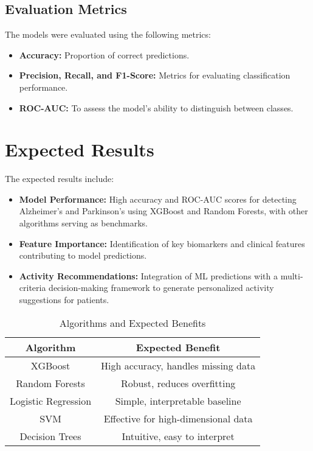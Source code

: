\documentclass[conference]{IEEEtran}
\begin{document}
\subsection{Evaluation Metrics}
The models were evaluated using the following metrics:
\begin{itemize}
    \item \textbf{Accuracy:} Proportion of correct predictions.
    \item \textbf{Precision, Recall, and F1-Score:} Metrics for evaluating classification performance.
    \item \textbf{ROC-AUC:} To assess the model's ability to distinguish between classes.
\end{itemize}

\section{Expected Results}
The expected results include:
\begin{itemize}
    \item \textbf{Model Performance:} High accuracy and ROC-AUC scores for detecting Alzheimer’s and Parkinson’s using XGBoost and Random Forests, with other algorithms serving as benchmarks.
    \item \textbf{Feature Importance:} Identification of key biomarkers and clinical features contributing to model predictions.
    \item \textbf{Activity Recommendations:} Integration of ML predictions with a multi-criteria decision-making framework to generate personalized activity suggestions for patients.
\end{itemize}

\begin{table}[htbp]
\caption{Algorithms and Expected Benefits}
\begin{center}
\begin{tabular}{|c|c|}
\hline
\textbf{Algorithm} & \textbf{Expected Benefit} \\
\hline
XGBoost & High accuracy, handles missing data \\
\hline
Random Forests & Robust, reduces overfitting \\
\hline
Logistic Regression & Simple, interpretable baseline \\
\hline
SVM & Effective for high-dimensional data \\
\hline
Decision Trees & Intuitive, easy to interpret \\
\hline
\end{tabular}
\label{tab1}
\end{center}
\end{table}
\end{document}
